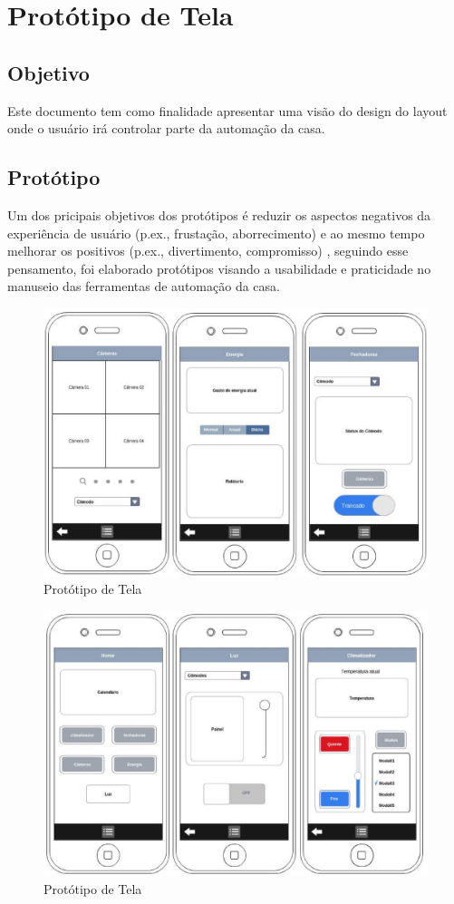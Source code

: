 \chapter{Protótipo de Tela}

\section{Objetivo}

Este documento tem como finalidade apresentar uma visão do design do layout onde o usuário irá controlar parte da automação da casa.

\section{Protótipo}

Um dos pricipais objetivos dos protótipos é reduzir os aspectos negativos da experiência de usuário (p.ex., frustação, aborrecimento) e ao mesmo tempo melhorar os positivos (p.ex., divertimento, compromisso) \cite{design3ed}, seguindo esse pensamento, foi elaborado protótipos visando a usabilidade e praticidade no manuseio das ferramentas de automação da casa.

\begin{figure}[!htb]
  \begin{center}
	\includegraphics[keepaspectratio,scale=0.6]{figuras/prototipo1.eps}
	\caption{Protótipo de Tela}
  \end{center}
\end{figure}

\begin{figure}[!htb]
  \begin{center}
	\includegraphics[keepaspectratio,scale=0.6]{figuras/prototipo2.eps}
	\caption{Protótipo de Tela}
  \end{center}
\end{figure}